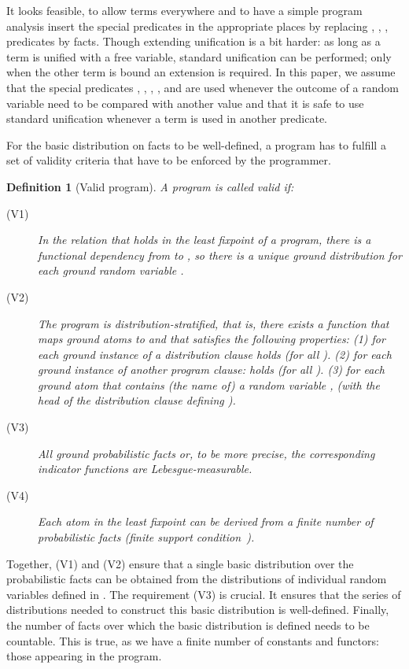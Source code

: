 \documentclass{tlp}
\newtheorem{definition}{Definition}
\begin{document}
It looks feasible, to allow  terms everywhere and to have a
simple program analysis insert the special predicates in the
appropriate places by replacing , , , 
predicates by  facts.  Though extending unification is a
bit harder: as long as a  term is unified with a free
variable, standard unification can be performed; only when the other
term is bound an extension is required.  In this paper, we assume that
the special predicates , ,
, , and
 are used whenever the outcome of a random
variable need to be compared with another value and that it is safe to
use standard unification whenever a  term is used in
another predicate.

For the basic distribution on facts to be well-defined, a program has
to fulfill a set of validity criteria that have to be enforced by the
programmer.

\begin{definition}[Valid program]
  \label{def:validprog}
  A program  is called \emph{valid} if: 

 \begin{description}
  \item[(V1)] In the relation  that holds
    in the least fixpoint of a program, there is a functional
    dependency from  to , so there is a
    unique ground distribution  for each ground random
    variable .

  \item[(V2)] The program is \emph{distribution-stratified}, that is,
    there exists a function  that maps ground atoms to
    and that satisfies the following properties: (1)
    for each ground instance of a distribution clause  holds
     (for all
    ).  (2) for each ground instance of another program clause:
     holds
     (for all ).  (3) for
    each ground atom  that contains (the name of) a random
    variable ,  (with  the head of the
    distribution clause defining ).

  \item[(V3)] All ground probabilistic facts or, to be more precise,
    the corresponding indicator functions are
    \emph{Lebesgue-measurable}.

  \item[(V4)] Each atom in the least fixpoint can be derived from a
    finite number of probabilistic facts (\emph{finite support
      condition}~\cite{Sato:95}).
  \end{description}
\end{definition}

Together, (V1) and (V2) ensure that a single basic distribution 
over the probabilistic facts can be obtained from the distributions of
individual random variables defined in .  The requirement (V3) is
crucial.  It ensures that the series of distributions 
needed to construct this basic distribution is well-defined.  Finally,
the number of facts over which the basic distribution is defined needs
to be countable. This is true, as we have a finite number of constants
and functors: those appearing in the program.
\end{document}
